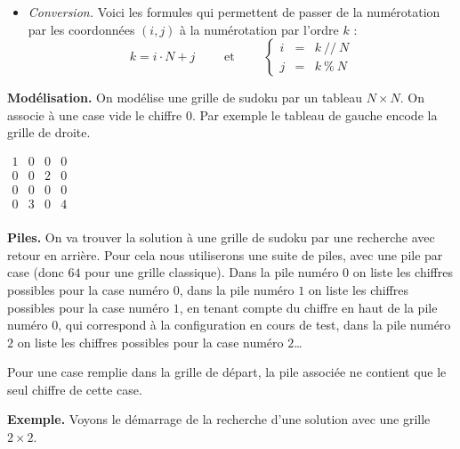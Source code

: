 \documentclass[11pt,class=report,crop=false]{standalone}
\begin{document}
\begin{cours}[Sudoku]
\begin{itemize}
	\item \emph{Conversion.}
	Voici les formules qui permettent de passer de la numérotation par les coordonnées $(i,j)$ à la numérotation par l'ordre $k$ :
	$$k = i\cdot N + j \qquad \text{ et } \qquad 
	\left\{\begin{array}{rcl}
	i & = & k \  // \ N\\
	j & = & k \ \% \  N
	\end{array}\right.$$	
\end{itemize}


\bigskip

\textbf{Modélisation.}
On modélise une grille de sudoku par un tableau $N \times N$. 
On associe à une case vide le chiffre $0$. Par exemple
le tableau de gauche encode la grille de droite.
\begin{center}
\begin{minipage}{0.2\textwidth}
$\begin{array}{cccc}
1 & 0 & 0 & 0 \\
0 & 0 & 2 & 0 \\
0 & 0 & 0 & 0 \\
0 & 3 & 0 & 4 \\
\end{array}$
\end{minipage}
\begin{minipage}{0.2\textwidth}
\end{minipage}   
\end{center}


\textbf{Piles.}
On va trouver la solution à une grille de sudoku par une recherche avec retour en arrière. Pour cela nous utiliserons une suite de piles, avec une pile par case (donc $64$ pour une grille classique). Dans la pile numéro $0$ on liste les chiffres possibles pour la case numéro $0$, dans la pile numéro $1$ on liste les chiffres possibles pour la case numéro $1$, en tenant compte du chiffre en haut de la pile numéro $0$, qui correspond à la configuration en cours de test, dans la pile numéro $2$ on liste les chiffres possibles pour la case numéro $2$\ldots

Pour une case remplie dans la grille de départ, la pile associée ne contient que le seul chiffre de cette case.

\bigskip

\textbf{Exemple.} Voyons le démarrage de la recherche d'une solution avec une grille $2\times2$.
  
  \smallskip
  
  

\end{cours}
\end{document}
